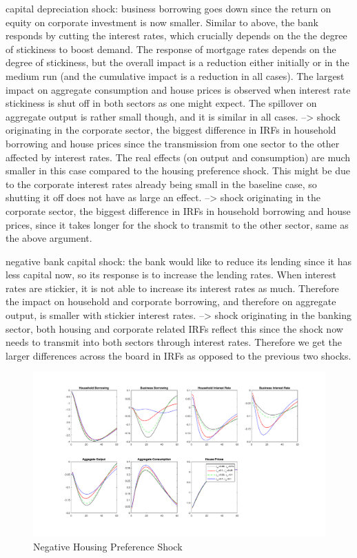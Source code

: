 \documentclass[12pt]{article}
\numberwithin{equation}{section}
\begin{document}
capital depreciation shock: business borrowing goes down since the return on equity on corporate investment is now smaller. Similar to above, the bank responds by cutting the interest rates, which crucially depends on the the degree of stickiness to boost demand. The response of mortgage rates depends on the degree of stickiness, but the overall impact is a reduction either initially or in the medium run (and the cumulative impact is a reduction in all cases). 
The largest impact on aggregate consumption and house prices is observed when interest rate stickiness is shut off in both sectors as one might expect. The spillover on aggregate output is rather small though, and it is similar in all cases. 
--> shock originating in the corporate sector, the biggest difference in IRFs in household borrowing and house prices since the transmission from one sector to the other affected by interest rates. The real effects (on output and consumption) are much smaller in this case compared to the housing preference shock. This might be due to the corporate interest rates already being small in the baseline case, so shutting it off does not have as large an effect.
--> shock originating in the corporate sector, the biggest difference in IRFs in household borrowing and house prices, since it takes longer for the shock to transmit to the other sector, same as the above argument.

negative bank capital shock: the bank would like to reduce its lending since it has less capital now, so its response is to increase the lending rates. When interest rates are stickier, it is not able to increase its interest rates as much. Therefore the impact on household and corporate borrowing, and therefore on aggregate output, is smaller with stickier interest rates. 
--> shock originating in the banking sector, both housing and corporate related IRFs reflect this since the shock now needs to transmit into both sectors through interest rates. Therefore we get the larger differences across the board in IRFs as opposed to the previous two shocks. 



\begin{figure}[H]
\centering
\caption{Negative Housing Preference Shock}
\includegraphics[scale=0.45]{stickinessJ.pdf}
\end{figure}
\end{document}
